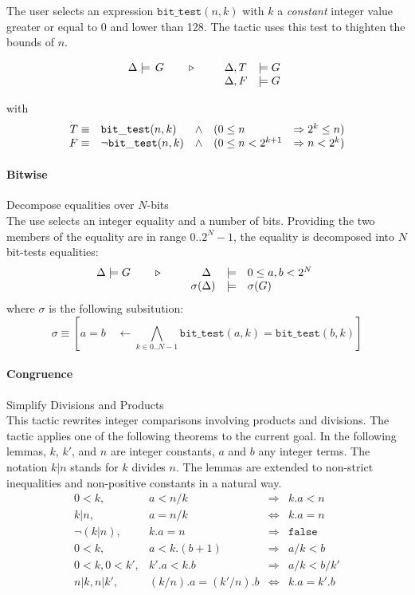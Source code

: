 The user selects an expression $\mathtt{bit\_test}(n,k)$ with $k$
a \emph{constant} integer value greater or equal to 0 and lower than
128. The tactic uses this test to thighten the bounds of $n$.

$$\TACTIC{\Delta\models\,G}{%
\begin{array}[t]{ll}
\Delta,T &\models G \\
\Delta,F &\models G
\end{array}} $$

with
$$\begin{array}[t]{rlcll}
  T \equiv & \mathtt{bit\_test}(n,k) & \wedge & (0 \leq n & \Rightarrow 2^{k} \leq n) \\
  F \equiv & \neg \mathtt{bit\_test}(n,k) & \wedge & (0 \leq n < 2^{k+1} & \Rightarrow n < 2^{k})
  \end{array}
$$

\paragraph{Bitwise} Decompose equalities over $N$-bits\\
The use selects an integer equality and a number of bits.
Providing the two members of the equality are in range $0..2^N-1$,
the equality is decomposed into $N$ bit-tests equalities:
\[\TACTIC{\Delta\models G}{%
\begin{array}[t]{rcl}
\Delta\phantom{)} &\models & 0 \leq a,b < 2^N \\
\sigma(\Delta) & \models & \sigma(G)
\end{array}
}\]
where $\sigma$ is the following subsitution:
\[ \sigma \equiv
\left[ a=b \quad \leftarrow
\bigwedge_{k\in 0..N-1} \mathtt{bit\_test}(a,k) = \mathtt{bit\_test}(b,k)
\right]
\]

\paragraph{Congruence} Simplify Divisions and Products \\
This tactic rewrites integer comparisons involving products and divisions.
The tactic applies one of the following theorems to the current goal.
In the following lemmas, $k$, $k'$, and $n$ are integer constants, $a$ and $b$ any integer terms.
The notation $k|n$ stands for $k$ divides $n$.
The lemmas are extended to non-strict inequalities and non-positive constants in a natural way.
\[
\begin{array}{crcl}
0<k, & a < n/k &\Longrightarrow& k.a < n \\
k|n, & a = n/k &\Longleftrightarrow& k.a = n \\
\neg(k|n), & k.a = n & \Longrightarrow & \mathtt{false} \\
0<k, & a < k.(b+1) &\Longrightarrow& a/k < b \\
0<k, 0<k', & k'.a < k.b &\Longrightarrow& a/k < b/k' \\
n|k, n|k', & (k/n).a = (k'/n).b &\Longleftrightarrow& k.a = k'.b
\end{array}
\]

